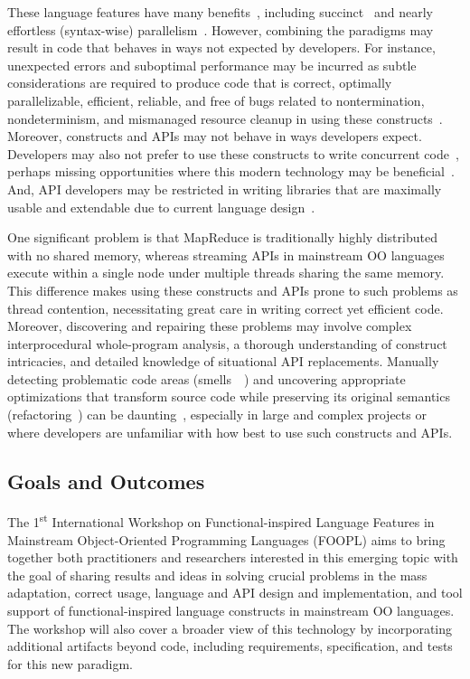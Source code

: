 \documentclass[10pt, conference]{IEEEtran}
\begin{document}
These language features have many benefits~\cite[Ch.~1]{Warburton2014}, including succinct~\cite{Mazinanian2017} and nearly effortless (syntax-wise) parallelism~\cite{OracleCorporation2015a}. However, combining the paradigms may result in code that behaves in ways not expected by developers. For instance, unexpected errors and suboptimal performance may be incurred as subtle considerations are required to produce code that is correct, optimally parallelizable, efficient, reliable, and free of bugs related to nontermination, nondeterminism, and mismanaged resource cleanup in using these constructs~\cite{Oracle2017d}. Moreover, constructs and APIs may not behave in ways developers expect. Developers may also not prefer to use these constructs to write concurrent code~\cite{Nielebock2018}, perhaps missing opportunities where this modern technology may be beneficial~\cite{Tang2018}. And, API developers may be restricted in writing libraries that are maximally usable and extendable due to current language design~\cite{Biboudis2015}.

One significant problem is that MapReduce is traditionally highly distributed with no shared memory, whereas streaming APIs in mainstream OO languages execute within a single node under multiple threads sharing the same memory. This difference makes using these constructs and APIs prone to such problems as thread contention, necessitating great care in writing correct yet efficient code. Moreover, discovering and repairing these problems may involve complex interprocedural whole-program analysis, a thorough understanding of construct intricacies, and detailed knowledge of situational API replacements. Manually detecting problematic code areas (smells~~\cite{Tufano2015,Fowler2008}) and uncovering appropriate optimizations that transform source code while preserving its original semantics (refactoring~\cite{Opdyke1992,Fowler1999}) can be daunting~\cite{Dig2009}, especially in large and complex projects or where developers are unfamiliar with how best to use such constructs and APIs.

\subsection{Goals and Outcomes}\label{sec:goals}

The 1\textsuperscript{st} International Workshop on Functional-inspired Language Features in Mainstream Object-Oriented Programming Languages (FOOPL) aims to bring together both practitioners and researchers interested in this emerging topic with the goal of sharing results and ideas in solving crucial problems in the mass adaptation, correct usage, language and API design and implementation, and tool support of functional-inspired language constructs in mainstream OO languages. The workshop will also cover a broader view of this technology by incorporating additional artifacts beyond code, including requirements, specification, and tests for this new paradigm.
\end{document}
